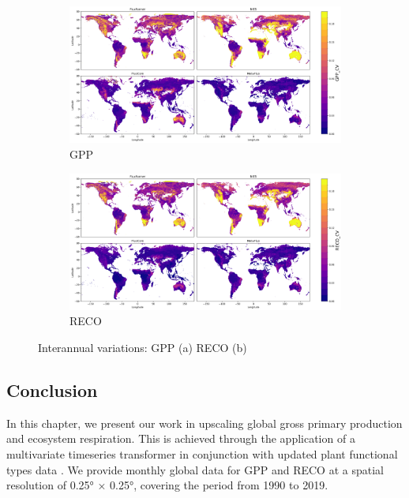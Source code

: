 \begin{figure}[tbh!]
    \centering
    \begin{subfigure}{\textwidth}
      \centering
      \includegraphics[width=\textwidth]{figs/chap6/IAV_GPP.png}
      \caption{GPP}
      \label{fig:chap6_fig8a}
    \end{subfigure}

    \begin{subfigure}{\textwidth}
      \centering
      \includegraphics[width=\textwidth]{figs/chap6/IAV_RECO.png}
      \caption{RECO}
      \label{fig:chap6_fig8b}
    \end{subfigure}
    \caption{Interannual variations: GPP (a) RECO (b)}
    \label{fig:chap6_fig8}
\end{figure}
\subsection{Conclusion}
In this chapter, we present our work in upscaling global gross primary production and ecosystem respiration. This is achieved through the application of a multivariate timeseries transformer \citep{zerveas2021transformer} in conjunction with updated plant functional types data \citep{harper202229}. We provide monthly global data for GPP and RECO at a spatial resolution of 0.25° × 0.25°, covering the period from 1990 to 2019. \par

